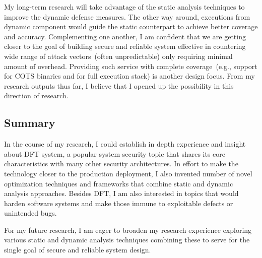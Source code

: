 \documentclass[letterpaper, 10pt]{article}
\begin{document}
\begin{small}
My long-term research will take advantage of the static analysis techniques to
improve the dynamic defense measures. 
%
The other way around, executions from dynamic component would guide the static
counterpart to achieve better coverage and accuracy.
%
Complementing one another, I am confident that we are getting closer to the
goal of building secure and reliable system effective in countering wide range
of attack vectors~(often unpredictable) only requiring minimal amount of
overhead. Providing such service with complete coverage~(e.g., support for COTS
binaries and for full execution stack) is another design focus.
%
From my research outputs thus far, I believe that I opened up the possibility
in this direction of research.

\subsection*{Summary} 
%
In the course of my research, I could establish in depth experience and insight
about DFT system, a popular system security topic that shares its core
characteristics with many other security architectures.
%
In effort to make the technology closer to the production deployment, I also
invented number of novel optimization techniques and frameworks that combine
static and dynamic analysis approaches.
%
Besides DFT, I am also interested in topics that would harden software systems
and make those immune to exploitable defects or unintended bugs. 

For my future research, I am eager to broaden my research experience
exploring various static and dynamic analysis techniques combining these to
serve for the single goal of secure and reliable system design.

\end{small} 

\newpage



\end{document}
